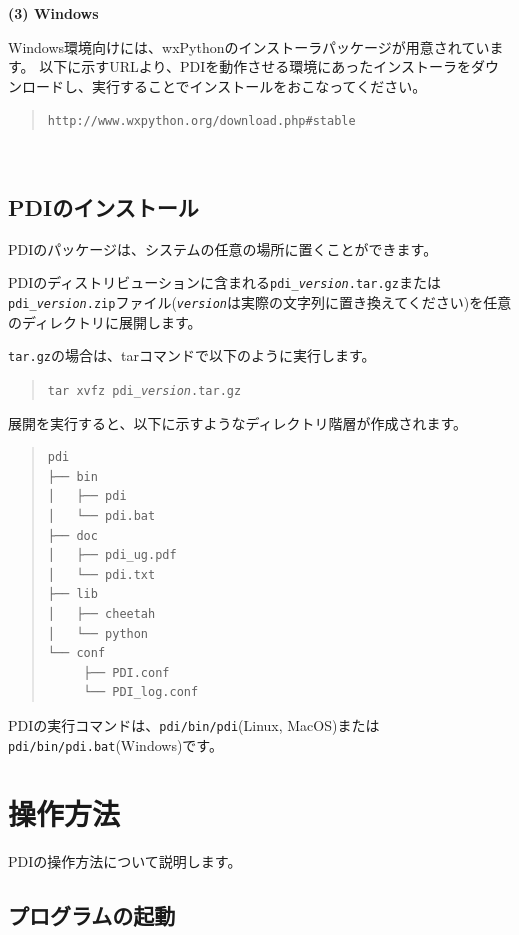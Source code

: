 \documentclass[a4paper,11pt]{jarticle}
\begin{document}
\textbf{(3) Windows}

Windows環境向けには、wxPythonのインストーラパッケージが用意されています。
以下に示すURLより、PDIを動作させる環境にあったインストーラをダウンロードし、実行することでインストールをおこなってください。
\begin{quote}
{\tt http://www.wxpython.org/download.php\#stable}
\end{quote}
{\ }\\



\subsection{PDIのインストール}

PDIのパッケージは、システムの任意の場所に置くことができます。

PDIのディストリビューションに含まれる{\tt pdi\_{\it version}.tar.gz}または{\tt pdi\_{\it version}.zip}ファイル({\tt\it version}は実際の文字列に置き換えてください)を任意のディレクトリに展開します。

{\tt tar.gz}の場合は、tarコマンドで以下のように実行します。

\begin{quote}
{\tt tar xvfz  pdi\_\textit{version}.tar.gz}
\end{quote}


展開を実行すると、以下に示すようなディレクトリ階層が作成されます。

\begin{quote}
\begin{verbatim}
pdi
├── bin
│   ├── pdi
│   └── pdi.bat
├── doc
│   ├── pdi_ug.pdf
│   └── pdi.txt
├── lib
│   ├── cheetah
│   └── python
└── conf
     ├── PDI.conf
     └── PDI_log.conf
\end{verbatim}
\end{quote}

PDIの実行コマンドは、{\tt pdi/bin/pdi}(Linux, MacOS)または{\tt pdi/bin/pdi.bat}(Windows)です。

\newpage
\section{操作方法}

PDIの操作方法について説明します。

\subsection{プログラムの起動}
\end{document}
